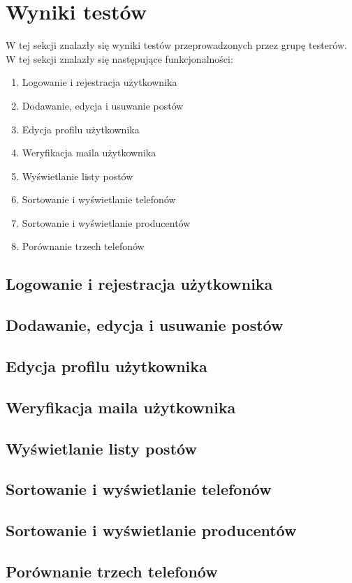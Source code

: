 \section{Wyniki testów}\label{results}
W tej sekcji znalazły się wyniki testów przeprowadzonych przez grupę testerów.
W tej sekcji znalazły się następujące funkcjonalności:
\begin{enumerate}
  \item Logowanie i rejestracja użytkownika
  \item Dodawanie, edycja i usuwanie postów
  \item Edycja profilu użytkownika
  \item Weryfikacja maila użytkownika
  \item Wyświetlanie listy postów
  \item Sortowanie i wyświetlanie telefonów
  \item Sortowanie i wyświetlanie producentów
  \item Porównanie trzech telefonów
\end{enumerate}

\subsection{Logowanie i rejestracja użytkownika}

\subsection{Dodawanie, edycja i usuwanie postów}

\subsection{Edycja profilu użytkownika}

\subsection{Weryfikacja maila użytkownika}

\subsection{Wyświetlanie listy postów}

\subsection{Sortowanie i wyświetlanie telefonów}

\subsection{Sortowanie i wyświetlanie producentów}

\subsection{Porównanie trzech telefonów}
